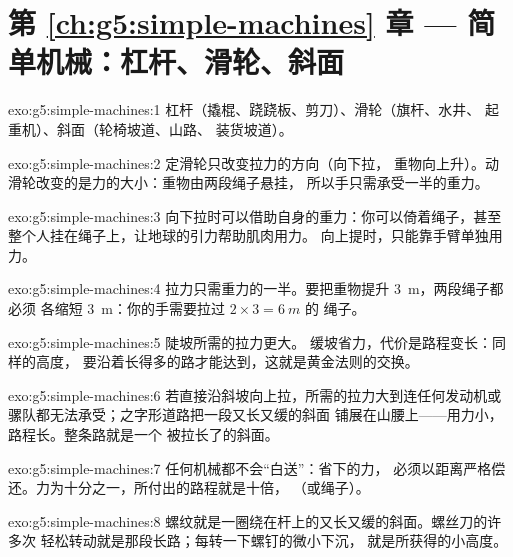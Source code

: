 \section*{第 \ref{ch:g5:simple-machines} 章 --- 简单机械：杠杆、滑轮、斜面}

\begin{solution}{exo:g5:simple-machines:1}
杠杆（撬棍、跷跷板、剪刀）、滑轮（旗杆、水井、
起重机）、斜面（轮椅坡道、山路、
装货坡道）。
\end{solution}

\begin{solution}{exo:g5:simple-machines:2}
定滑轮只改变拉力的方向（向下拉，
重物向上升）。动滑轮改变的是力的大小：重物由两段绳子悬挂，
所以手只需承受一半的重力。
\end{solution}

\begin{solution}{exo:g5:simple-machines:3}
向下拉时可以借助自身的重力：你可以倚着绳子，甚至
整个人挂在绳子上，让地球的引力帮助肌肉用力。
向上提时，只能靠手臂单独用力。
\end{solution}

\begin{solution}{exo:g5:simple-machines:4}
拉力只需重力的一半。要把重物提升 \qty{3}{m}，两段绳子都必须
各缩短 \qty{3}{m}：你的手需要拉过 $2 \times 3 = \qty{6}{m}$ 的
绳子。
\end{solution}

\begin{solution}{exo:g5:simple-machines:5}
陡坡所需的拉力更大。
缓坡省力，代价是路程变长：同样的高度，
要沿着长得多的路才能达到，这就是黄金法则的交换。
\end{solution}

\begin{solution}{exo:g5:simple-machines:6}
若直接沿斜坡向上拉，所需的拉力大到连任何发动机或
骡队都无法承受；之字形道路把一段又长又缓的斜面
铺展在山腰上——用力小，路程长。整条路就是一个
被拉长了的斜面。
\end{solution}

\begin{solution}{exo:g5:simple-machines:7}
任何机械都不会“白送”：省下的力，
必须以距离严格偿还。力为十分之一，所付出的路程就是十倍，
（或绳子）。
\end{solution}

\begin{solution}{exo:g5:simple-machines:8}
螺纹就是一圈绕在杆上的又长又缓的斜面。螺丝刀的许多次
轻松转动就是那段长路；每转一下螺钉的微小下沉，
就是所获得的小高度。
\end{solution}

